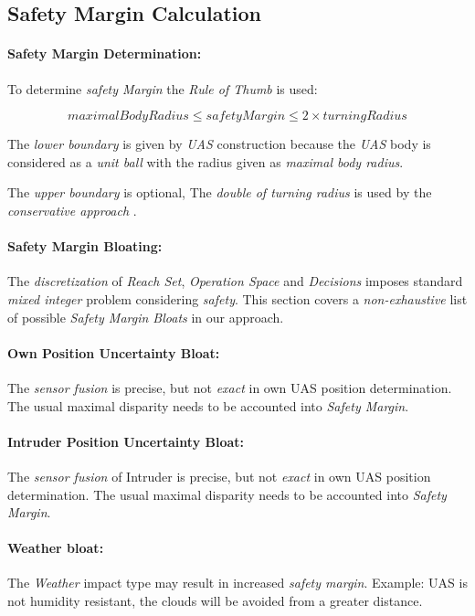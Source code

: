 \newpage
\subsection{Safety Margin Calculation}\label{s:safetyMarginCalculation}
\paragraph{Safety Margin Determination:} To determine \emph{safety Margin} the \emph{Rule of Thumb} is used:

\begin{equation}
    maximal Body Radius \le safety Margin \le 2 \times turning Radius
\end{equation}

\noindent The \emph{lower boundary} is given by \emph{UAS} construction because the \emph{UAS} body is considered as a \emph{unit ball} with the radius given as \emph{maximal body radius}. 

The \emph{upper boundary} is optional, The \emph{double of \emph{turning radius}} is used by the \emph{conservative approach} \cite{borenstein1991vector}.


\paragraph{Safety Margin Bloating:}  The \emph{discretization} of \emph{Reach Set}, \emph{Operation Space} and \emph{Decisions} imposes standard \emph{mixed integer} problem considering \emph{safety}. This section covers a \emph{non-exhaustive} list of possible \emph{Safety Margin Bloats} in our approach.

\paragraph{Own Position Uncertainty Bloat:} The \emph{sensor fusion} is precise, but not \emph{exact} in own UAS position determination. The usual maximal disparity needs to be accounted into \emph{Safety Margin}.

\paragraph{Intruder Position Uncertainty Bloat:} The \emph{sensor fusion} of Intruder is precise, but not \emph{exact} in own UAS position determination. The usual maximal disparity needs to be accounted into \emph{Safety Margin}.

\paragraph{Weather bloat:} The \emph{Weather} impact type may result in increased \emph{safety margin}. Example: UAS is not humidity resistant, the clouds will be avoided from a greater distance.

